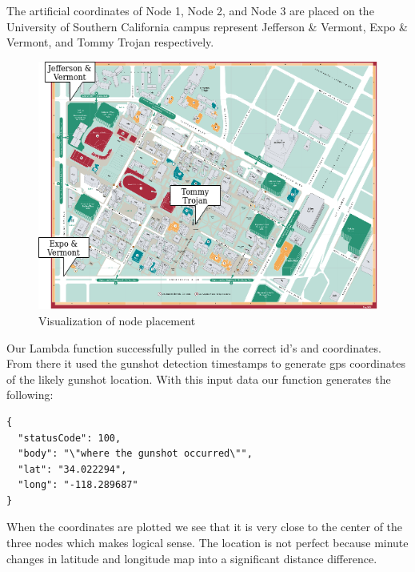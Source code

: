 \documentclass[conference]{IEEEtran}
\begin{document}
The artificial coordinates of Node 1, Node 2, and Node 3 are placed on the University of Southern California campus represent Jefferson \& Vermont, Expo \& Vermont, and Tommy Trojan respectively.

\begin{figure}[htbp]
\centerline{\includegraphics[width=0.9\columnwidth]{nodes_usc.png}}
\caption{Visualization of node placement}
\label{fig}
\end{figure}

Our Lambda function successfully pulled in the  correct id's and coordinates. From there it used the gunshot detection timestamps to generate gps coordinates of the likely gunshot location. With this input data our function generates the following:


\begin{small}
\begin{verbatim}
{
  "statusCode": 100,
  "body": "\"where the gunshot occurred\"",
  "lat": "34.022294",
  "long": "-118.289687"
}
\end{verbatim}
\end{small}

When the coordinates are plotted we see that it is very close to the center of the three nodes which makes logical sense. The location is not perfect because minute changes in latitude and longitude map into a significant distance difference.

%
\end{document}
